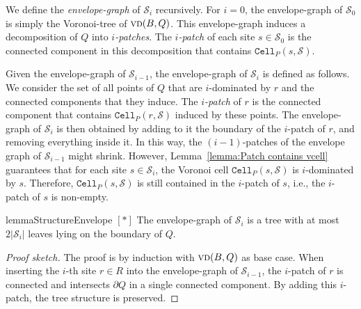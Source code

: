 \documentclass[a4paper,UKenglish]{socg-lipics-v2018}
\newcommand{\icell}[1][i]{${#1}$-patch\xspace}
\newcommand{\icells}[1][i]{${#1}$-patches\xspace}
\newcommand{\s}{\mathcal S}
\newcommand{\cell}[2][P]{\ensuremath{\mathtt{Cell}_{\scriptscriptstyle #1}(#2)}}
\newcommand{\vd}[2][P]{\textsc{vd}(#2, #1)}
\begin{document}
We define the \emph{envelope-graph} of $\s_i$ recursively. 
For $i = 0$, the envelope-graph of $\s_0$ is simply the Voronoi-tree of $\vd[Q]{B}$.
This envelope-graph induces a decomposition of $Q$ into \emph{\icells}.
The \emph{\icell} of each site $s\in \s_0$ is the connected component in this decomposition that contains $\cell{s, \s}$.

Given the envelope-graph of $\s_{i-1}$, the envelope-graph of $\s_i$ is defined as follows.
We consider the set of all points of $Q$ that are $i$-dominated by $r$ and the connected components that they induce. 
The \emph{\icell} of $r$ is the connected component that contains $\cell{r, \s}$ induced by these points.
The envelope-graph of $\s_i$ is then obtained by adding to it the boundary of the \icell of $r$, and removing everything inside it. 
In this way, the \icells[(i-1)] of the envelope graph of $\s_{i-1}$ might shrink. 
However, Lemma~\ref{lemma:Patch contains vcell} guarantees that for each site $s\in \s_i$, the Voronoi cell $\cell{s, \s}$ is $i$-dominated by $s$.
Therefore, $\cell{s, \s}$ is still contained in the \icell of $s$, i.e., the \icell of $s$ is non-empty.

\begin{restatable}{lemma}{StructureEnvelope}\label{lemma:Structure of the envelope}
$[*]$
The envelope-graph of $\s_i$ is a tree with at most $2|\s_i|$ leaves lying on the boundary of $Q$.
\end{restatable}
\begin{proof}[Proof sketch]
The proof is by induction with $\vd[Q]{B}$ as base case. 
When inserting the $i$-th site $r\in R$ into the envelope-graph of $\s_{i-1}$, the \icell of $r$ is connected and intersects $\partial Q$ in a single connected component. By adding this \icell, the tree structure is preserved.
\end{proof}
\end{document}

